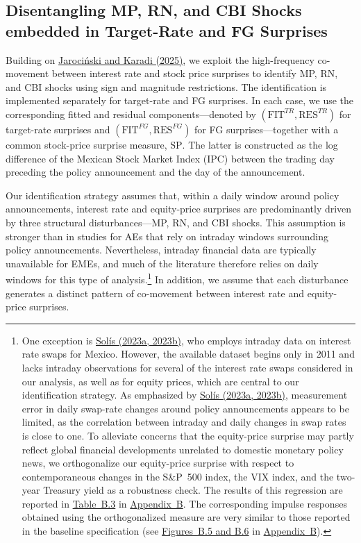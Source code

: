 \documentclass[12pt, reqno]{article}
\begin{document}
\subsection{Disentangling MP, RN, and CBI Shocks embedded in Target-Rate and FG Surprises}

Building on \hyperlink{Jarociński and Karadi (2025)}{Jarociński and Karadi (2025)}, we exploit the high-frequency co-movement between interest rate and stock price surprises to identify MP, RN, and CBI shocks using sign and magnitude restrictions. The identification is implemented separately for target-rate and FG surprises. In each case, we use the corresponding fitted and residual components—denoted by $(\text{FIT}^{TR}, \text{RES}^{TR})$ for target-rate surprises and $(\text{FIT}^{FG}, \text{RES}^{FG})$ for FG surprises—together with a common stock-price surprise measure, $\text{SP}$. The latter is constructed as the log difference of the Mexican Stock Market Index (IPC) between the trading day preceding the policy announcement and the day of the announcement.


Our identification strategy assumes that, within a daily window around policy announcements, interest rate and equity-price surprises are predominantly driven by three structural disturbances—MP, RN, and CBI shocks. This assumption is stronger than in studies for AEs that rely on intraday windows surrounding policy announcements. Nevertheless, intraday financial data are typically unavailable for EMEs, and much of the literature therefore relies on daily windows for this type of analysis.\footnote{One exception is \hyperlink{Solis (2023a)}{Solís (2023a, 2023b)}, who employs intraday data on interest rate swaps for Mexico. However, the available dataset begins only in 2011 and lacks intraday observations for several of the interest rate swaps considered in our analysis, as well as for equity prices, which are central to our identification strategy. As emphasized by \hyperlink{Solis (2023a)}{Solís (2023a, 2023b)}, measurement error in daily swap-rate changes around policy announcements appears to be limited, as the correlation between intraday and daily changes in swap rates is close to one. To alleviate concerns that the equity-price surprise may partly reflect global financial developments unrelated to domestic monetary policy news, we orthogonalize our equity-price surprise with respect to contemporaneous changes in the S\&P~500 index, the VIX index, and the two-year Treasury yield as a robustness check. The results of this regression are reported in \hyperlink{Table B.3}{Table~B.3} in \hyperlink{Appendix B}{Appendix~B}. The corresponding impulse responses obtained using the orthogonalized measure are very similar to those reported in the baseline specification (see \hyperlink{Figure B.5}{Figures~B.5 and B.6} in \hyperlink{Appendix B}{Appendix~B}).
} In addition, we assume that each disturbance generates a distinct pattern of co-movement between interest rate and equity-price surprises.
\end{document}
